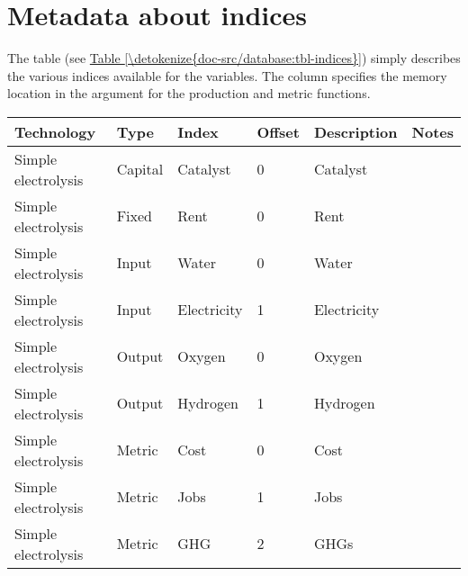 \documentclass[letterpaper,10pt,english]{sphinxmanual}
\begin{document}
\section{Metadata about indices}
\label{\detokenize{doc-src/database:metadata-about-indices}}
The  table (see \hyperref[\detokenize{doc-src/database:tbl-indices}]{Table \ref{\detokenize{doc-src/database:tbl-indices}}}) simply describes the various
indices available for the variables. The  column specifies the
memory location in the argument for the production and metric functions.


\begin{savenotes}\sphinxattablestart
\centering
{}
\sphinxthecaptionisattop
{}\label{\detokenize{doc-src/database:table-1}}\label{\detokenize{doc-src/database:tbl-indices}}
\sphinxaftertopcaption
\begin{tabulary}{\linewidth}[t]{|T|T|T|T|T|T|}
\hline
\sphinxstyletheadfamily 
Technology
&\sphinxstyletheadfamily 
Type
&\sphinxstyletheadfamily 
Index
&\sphinxstyletheadfamily 
Offset
&\sphinxstyletheadfamily 
Description
&\sphinxstyletheadfamily 
Notes
\\
\hline
Simple electrolysis
&
Capital
&
Catalyst
&
0
&
Catalyst
&\\
\hline
Simple electrolysis
&
Fixed
&
Rent
&
0
&
Rent
&\\
\hline
Simple electrolysis
&
Input
&
Water
&
0
&
Water
&\\
\hline
Simple electrolysis
&
Input
&
Electricity
&
1
&
Electricity
&\\
\hline
Simple electrolysis
&
Output
&
Oxygen
&
0
&
Oxygen
&\\
\hline
Simple electrolysis
&
Output
&
Hydrogen
&
1
&
Hydrogen
&\\
\hline
Simple electrolysis
&
Metric
&
Cost
&
0
&
Cost
&\\
\hline
Simple electrolysis
&
Metric
&
Jobs
&
1
&
Jobs
&\\
\hline
Simple electrolysis
&
Metric
&
GHG
&
2
&
GHGs
&\\
\hline
\end{tabulary}
\par
\sphinxattableend\end{savenotes}
\end{document}
